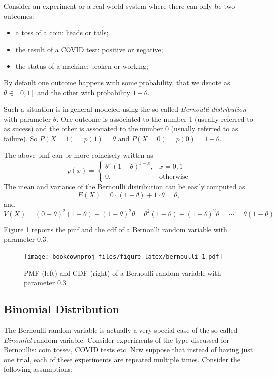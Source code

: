 \documentclass[
]{book}
\begin{document}
Consider an experiment or a real-world system where there can only be two outcomes:

\begin{itemize}
\item
  a toss of a coin: heads or tails;
\item
  the result of a COVID test: positive or negative;
\item
  the status of a machine: broken or working;
\end{itemize}

By default one outcome happens with some probability, that we denote as \(\theta\in [0,1]\) and the other with probability \(1-\theta\).

Such a situation is in general modeled using the so-called \emph{Bernoulli distribution} with parameter \(\theta\). One outcome is associated to the number 1 (usually referred to as sucess) and the other is associated to the number 0 (usually referred to as failure). So \(P(X=1)=p(1)=\theta\) and \(P(X=0)=p(0)=1-\theta\).

The above pmf can be more coincisely written as
\[
p(x)=\left\{
\begin{array}{ll}
\theta^x(1-\theta)^{1-x}, & x=0,1\\
0, & \mbox{otherwise}
\end{array}
\right.
\]
The mean and variance of the Bernoulli distribution can be easily computed as
\[
E(X)=0\cdot(1-\theta)+ 1\cdot\theta=\theta,
\]
and
\[
V(X)=(0-\theta)^2(1-\theta)+(1-\theta)^2\theta=\theta^2(1-\theta)+(1-\theta)^2\theta=\cdots = \theta(1-\theta)
\]

Figure \ref{fig:bernoulli} reports the pmf and the cdf of a Bernoulli random variable with parameter 0.3.

\begin{figure}
\centering
\texttt{[image: bookdownproj\_files/figure-latex/bernoulli-1.pdf]}
\caption{\label{fig:bernoulli}PMF (left) and CDF (right) of a Bernoulli random variable with parameter 0.3}
\end{figure}

\hypertarget{binomial-distribution}{%
\subsection{Binomial Distribution}\label{binomial-distribution}}

The Bernoulli random variable is actually a very special case of the so-called \emph{Binomial} random variable. Consider experiments of the type discussed for Bernoullis: coin tosses, COVID tests etc. Now suppose that instead of having just one trial, each of these experiments are repeated multiple times. Consider the following assumptions:
\end{document}
